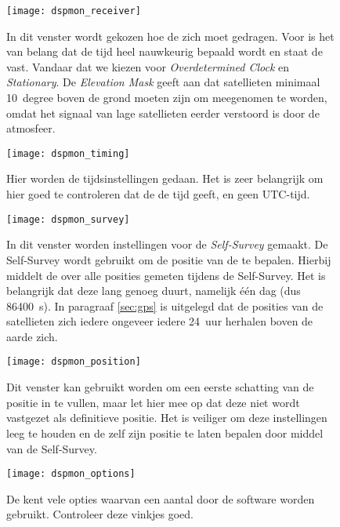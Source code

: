 \begin{figure}
    \centering
    \texttt{[image: dspmon\_receiver]}
    \caption{In dit venster wordt gekozen hoe de \gps zich moet gedragen.
    Voor \hisparc is het van belang dat de tijd heel nauwkeurig bepaald
    wordt en staat de \gps vast. Vandaar dat we kiezen voor
    \emph{Overdetermined Clock} en \emph{Stationary}. De \emph{Elevation
    Mask} geeft aan dat satellieten minimaal \SI{10}{ degree} boven de
    grond moeten zijn om meegenomen te worden, omdat het signaal van
    lage satellieten eerder verstoord is door de atmosfeer.}
    \label{fig:dspmon_receiver}
\end{figure}

\begin{figure}
    \centering
    \texttt{[image: dspmon\_timing]}
    \caption{Hier worden de tijdsinstellingen gedaan. Het is zeer
    belangrijk om hier goed te controleren dat de \gps de \gps tijd
    geeft, en geen UTC-tijd.}
    \label{fig:dspmon_timing}
\end{figure}

\begin{figure}
    \centering
    \texttt{[image: dspmon\_survey]}
    \caption{In dit venster worden instellingen voor de
             \emph{Self-Survey} gemaakt. De Self-Survey wordt gebruikt
             om de positie van de \gps te bepalen. Hierbij middelt de
             \gps over alle posities gemeten tijdens de Self-Survey. Het
             is belangrijk dat deze lang genoeg duurt, namelijk één dag
             (dus \SI{86400}{\second}). In paragraaf \ref{sec:gps} is
             uitgelegd dat de posities van de \gps satellieten zich
             iedere ongeveer iedere \SI{24}{uur} herhalen boven de aarde
             zich.}
    \label{fig:dspmon_survey}
\end{figure}

\begin{figure}
    \centering
    \texttt{[image: dspmon\_position]}
    \caption{Dit venster kan gebruikt worden om een eerste schatting van
    de positie in te vullen, maar let hier mee op dat deze niet wordt
    vastgezet als definitieve positie. Het is veiliger om deze
    instellingen leeg te houden en de \gps zelf zijn positie te laten
    bepalen door middel van de Self-Survey.}
    \label{fig:dspmon_position}
\end{figure}

\begin{figure}
    \centering
    \texttt{[image: dspmon\_options]}
    \caption{De \gps kent vele opties waarvan een aantal door de \hisparc
    software worden gebruikt. Controleer deze vinkjes goed.}
    \label{fig:dspmon_options}
\end{figure}

